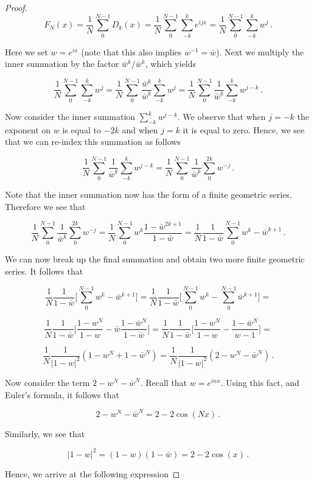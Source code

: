 \documentclass[a4paper]{article}
\numberwithin{equation}{section}
\begin{document}
\begin{description}
\begin{proof}
$$F_N(x) = \frac{1}{N}\sum_0^{N-1}D_k(x) = \frac{1}{N}\sum_0^{N-1}\sum_{-k}^k e^{ijx} = \frac{1}{N}\sum_0^{N-1}\sum_{-k}^k w^j\,.$$

Here we set $w = e^{ix}$ (note that this also implies $w^{-1} = \bar{w}$). Next we multiply the inner summation by the factor $\bar{w}^k/\bar{w}^k$, which yields

$$\frac{1}{N}\sum_0^{N-1}\sum_{-k}^k w^j = \frac{1}{N}\sum_0^{N-1} \frac{\bar{w}^k}{\bar{w}^k} \sum_{-k}^k w^j = \frac{1}{N}\sum_0^{N-1} \frac{1}{\bar{w}^k} \sum_{-k}^k w^{j-k}\,.$$

Now consider the inner summation $\sum_{-k}^k w^{j-k}$. We observe that when $j = -k$ the exponent on $w$ is equal to $-2k$ and when $j = k$ it is equal to zero. Hence, we see that we can re-index this summation as follows

$$\frac{1}{N}\sum_0^{N-1} \frac{1}{\bar{w}^k} \sum_{-k}^k w^{j-k} = \frac{1}{N}\sum_0^{N-1} \frac{1}{\bar{w}^k} \sum_{0}^{2k} w^{-j}\,.$$

Note that the inner summation now has the form of a finite geometric series. Therefore we see that

$$\frac{1}{N}\sum_0^{N-1} \frac{1}{\bar{w}^k} \sum_{0}^{2k} w^{-j} = \frac{1}{N}\sum_0^{N-1} w^k \frac{1-\bar{w}^{2k+1}}{1-\bar{w}} = \frac{1}{N}\frac{1}{1-\bar{w}}\sum_0^{N-1} w^k-\bar{w}^{k+1}\,.$$

We can now break up the final summation and obtain two more finite geometric series. It follows that

$$\frac{1}{N}\frac{1}{1-\bar{w}}\Big[\sum_0^{N-1} w^k-\bar{w}^{k+1} \Big] = \frac{1}{N}\frac{1}{1-\bar{w}}\Big[\sum_0^{N-1} w^k- \sum_0^{N-1}\bar{w}^{k+1}\Big] = $$

$$\frac{1}{N}\frac{1}{1-\bar{w}}\Big[\frac{1-w^N}{1-w}- \bar{w}\frac{1-\bar{w}^N}{1-\bar{w}}\Big] = \frac{1}{N}\frac{1}{1-\bar{w}}\Big[\frac{1-w^N}{1-w}- \frac{1-\bar{w}^N}{w-1}\Big] = $$

$$\frac{1}{N}\frac{1}{|1-w|^2}(1-w^N+ 1-\bar{w}^N) =\frac{1}{N}\frac{1}{|1-w|^2}(2-w^N-\bar{w}^N)\,.$$

Now consider the term $2-w^N - \bar{w}^N$. Recall that $w = e^{inx}$. Using this fact, and Euler's formula, it follows that

$$2-w^N - \bar{w}^N = 2-2\cos(Nx)\,.$$

Similarly, we see that 

$$|1-w|^2 = (1-w)(1-\bar{w}) = 2-2\cos(x)\,.$$ 

Hence, we arrive at the following expression


\end{proof}
\end{description}
\end{document}
